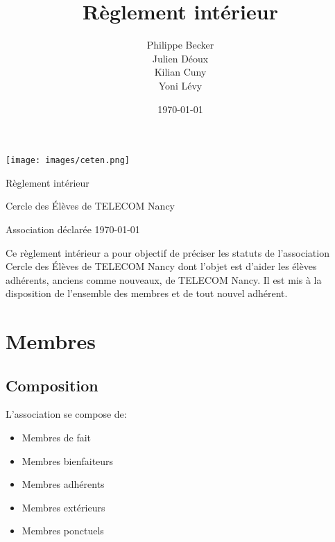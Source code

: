 \documentclass{article} %
\title{Règlement intérieur}
\author{Philippe Becker \\
	Julien Déoux \\
	Kilian Cuny \\
	Yoni Lévy}
\date\today
\begin{document}

	
	\begin{titlepage}
		\begin{center}
			\texttt{[image: images/ceten.png]}\par
			\vspace{3cm}
			{\Huge\light{} Règlement intérieur}\par
			\vfill
			{\large Cercle des Élèves de TELECOM Nancy}\par
			{\large\light{} Association déclarée}
			\vfill
			{\light\today}\par
		\end{center}
	\end{titlepage}
	
	
	\tableofcontents

	
	\vfill
	\begin{center}
		{\light{} Ce règlement intérieur a pour objectif de préciser les statuts
		de l’association Cercle des Élèves de TELECOM Nancy dont l’objet est
		d’aider les élèves adhérents, anciens comme nouveaux, de TELECOM Nancy.
		Il est mis à la disposition de l’ensemble des membres et de tout nouvel
		adhérent.}
	\end{center}
	\vfill

	\clearpage



	\section{Membres}
\label{sec:membres}

		\subsection{Composition}
\label{sub:composition}

			L’association se compose de:
			\begin{itemize}
				\item Membres de fait
				\item Membres bienfaiteurs
				\item Membres adhérents
				\item Membres extérieurs
				\item Membres ponctuels
			\end{itemize}
\end{document}
